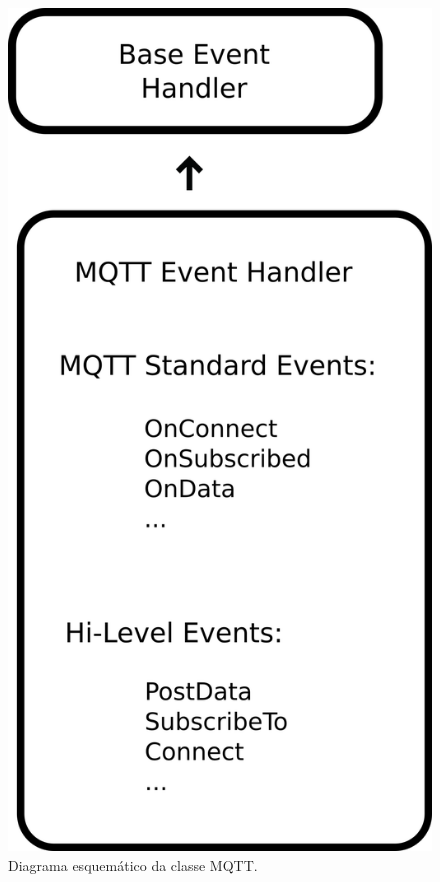 \begin{figure}[htb]
    \begin{center}
	    \includegraphics[scale=0.5]{figs/mqtt-dia.png}
	\end{center}
	\caption{\label{fig:mqtt} Diagrama esquemático da classe MQTT.} 
\end{figure}


